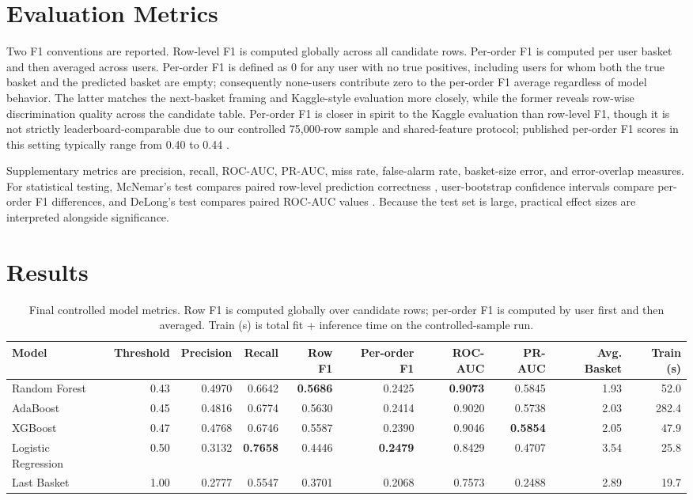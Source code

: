 \documentclass[10pt,twocolumn]{article}
\begin{document}
\section{Evaluation Metrics}

Two F1 conventions are reported. Row-level F1 is computed globally across all candidate rows. Per-order F1 is computed per user basket and then averaged across users. Per-order F1 is defined as $0$ for any user with no true positives, including users for whom both the true basket and the predicted basket are empty; consequently none-users contribute zero to the per-order F1 average regardless of model behavior. The latter matches the next-basket framing and Kaggle-style evaluation more closely, while the former reveals row-wise discrimination quality across the candidate table. Per-order F1 is closer in spirit to the Kaggle evaluation than row-level F1, though it is not strictly leaderboard-comparable due to our controlled 75{,}000-row sample and shared-feature protocol; published per-order F1 scores in this setting typically range from 0.40 to 0.44 \citep{syntheticjohn2019instacart, olsonswanson2018instacart}.

Supplementary metrics are precision, recall, ROC-AUC, PR-AUC, miss rate, false-alarm rate, basket-size error, and error-overlap measures. For statistical testing, McNemar's test compares paired row-level prediction correctness \citep{mcnemar1947}, user-bootstrap confidence intervals compare per-order F1 differences, and DeLong's test compares paired ROC-AUC values \citep{delong1988}. Because the test set is large, practical effect sizes are interpreted alongside significance.

\section{Results}

\begin{table}[t]
\centering
\caption{Final controlled model metrics. Row F1 is computed globally over candidate rows; per-order F1 is computed by user first and then averaged. Train (s) is total fit + inference time on the controlled-sample run.}
\label{tab:metrics}
\scriptsize
\begin{tabular}{lrrrrrrrrr}
\toprule
Model & Threshold & Precision & Recall & Row F1 & Per-order F1 & ROC-AUC & PR-AUC & Avg. Basket & Train (s) \\
\midrule
Random Forest & 0.43 & 0.4970 & 0.6642 & \textbf{0.5686} & 0.2425 & \textbf{0.9073} & 0.5845 & 1.93 & 52.0 \\
AdaBoost & 0.45 & 0.4816 & 0.6774 & 0.5630 & 0.2414 & 0.9020 & 0.5738 & 2.03 & 282.4 \\
XGBoost & 0.47 & 0.4768 & 0.6746 & 0.5587 & 0.2390 & 0.9046 & \textbf{0.5854} & 2.05 & 47.9 \\
Logistic Regression & 0.50 & 0.3132 & \textbf{0.7658} & 0.4446 & \textbf{0.2479} & 0.8429 & 0.4707 & 3.54 & 25.8 \\
Last Basket & 1.00 & 0.2777 & 0.5547 & 0.3701 & 0.2068 & 0.7573 & 0.2488 & 2.89 & 19.7 \\
\bottomrule
\end{tabular}
\end{table}
\end{document}

